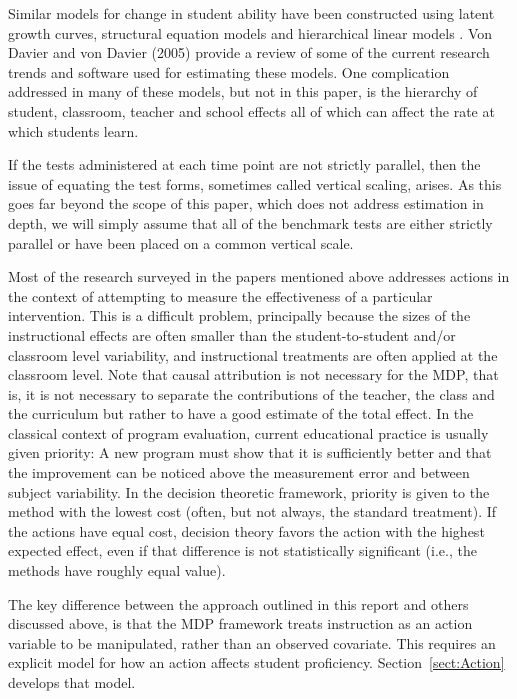 \documentclass[12pt]{RR-article}
\begin{document}
Similar models for change in student ability have been constructed
using latent growth curves, structural equation models and
hierarchical linear models \cite{Raudenbush2001}.  Von Davier and von
Davier (2005\nocite{vonDavier2}) provide a review of some of the
current research trends and software used for estimating these models.
One complication addressed in many of these models, but not in this
paper, is the hierarchy of student, classroom, teacher and school
effects all of which can affect the rate at which students learn.

If the tests administered at each time point are not strictly
parallel, then the issue of equating the test forms, sometimes called
vertical scaling, arises.  As this goes far beyond the scope of this
paper, which does not address estimation in depth, we will simply
assume that all of the benchmark tests are either strictly parallel or
have been placed on a common vertical scale.

Most of the research surveyed in the papers mentioned above addresses
actions in the context of attempting to measure the effectiveness of a
particular intervention.  This is a difficult problem, principally
because the sizes of the instructional effects are often smaller than
the student-to-student and/or classroom level variability, and
instructional treatments are often applied at the classroom level.
Note that causal attribution is not necessary for the MDP, that is, it
is not necessary to separate the contributions of the teacher, the
class and the curriculum but rather to have a good estimate of the
total effect.  In the classical context of program evaluation, current
educational practice is usually given priority:  A new program must
show that it is sufficiently better and that the improvement can be
noticed above the measurement error and between subject variability.
In the decision theoretic framework, priority is given to the method
with the lowest cost (often, but not always, the standard treatment).
If the actions have equal cost, decision theory favors the action with
the highest expected effect, even if that difference is not
statistically significant (i.e., the methods have roughly equal
value).

The key difference between the approach outlined in this report and
others discussed above, is that the MDP framework
treats instruction as an action variable to be manipulated, rather
than an observed covariate.  This requires an explicit model for how
an action affects student proficiency.  Section~\ref{sect:Action}
develops that model.
\end{document}
